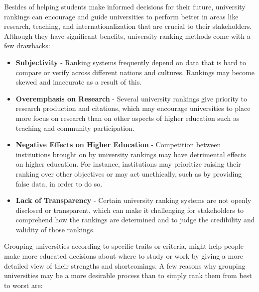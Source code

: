 \documentclass[conference]{IEEEtran}
\begin{document}
Besides of helping students make informed decisions for their future, university rankings can encourage and guide universities to perform better in areas like research, teaching, and internationalization that are crucial to their stakeholders. \\
Although they have significant benefits, university ranking methods come with a few drawbacks: \\

\begin{itemize}
    \item \textbf{Subjectivity} - Ranking systems frequently depend on data that is hard to compare or verify across different nations and cultures. Rankings may become skewed and inaccurate as a result of this. 
    \item \textbf{Overemphasis on Research} - Several university rankings give priority to research production and citations, which may encourage universities to place more focus on research than on other aspects of higher education such as teaching and community participation. 
    \item \textbf{Negative Effects on Higher Education} - Competition between institutions brought on by university rankings may have detrimental effects on higher education. For instance, institutions may prioritize raising their ranking over other objectives or may act unethically, such as by providing false data, in order to do so. 
    \item \textbf{Lack of Transparency} - Certain university ranking systems are not openly disclosed or transparent, which can make it challenging for stakeholders to comprehend how the rankings are determined and to judge the credibility and validity of those rankings. \\
\end{itemize}

Grouping universities according to specific traits or criteria, might help people make more educated decisions about where to study or work by giving a more detailed view of their strengths and shortcomings. A few reasons why grouping universities may be a more desirable process than to simply rank them from best to worst are: \\
\end{document}
